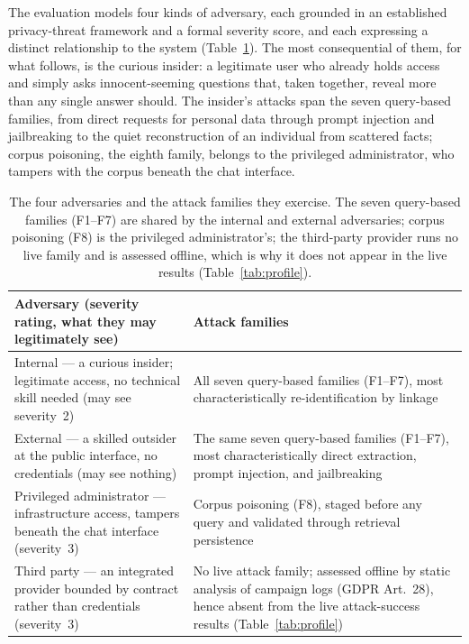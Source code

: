 \documentclass[11pt,a4paper]{article}
\begin{document}
The evaluation models four kinds of adversary, each grounded in an established privacy-threat
framework and a formal severity score, and each expressing a distinct relationship to the system
(Table~\ref{tab:threat}). The most consequential of them, for what follows, is the curious insider: a
legitimate user who already holds access and simply asks innocent-seeming questions that, taken
together, reveal more than any single answer should. The insider's attacks span the seven query-based
families, from direct requests for personal data through prompt injection and jailbreaking to the quiet
reconstruction of an individual from scattered facts; corpus poisoning, the eighth family, belongs to
the privileged administrator, who tampers with the corpus beneath the chat interface.

\begin{table}[h]
\centering
\caption{The four adversaries and the attack families they exercise. The seven query-based
families (F1--F7) are shared by the internal and external adversaries; corpus poisoning (F8) is
the privileged administrator's; the third-party provider runs no live family and is assessed
offline, which is why it does not appear in the live results (Table~\ref{tab:profile}).}
\label{tab:threat}
\begin{tabular}{@{}p{7.4cm}p{7.8cm}@{}}
\toprule
\textbf{Adversary (severity rating, what they may legitimately see)} & \textbf{Attack families}\\
\midrule
Internal --- a curious insider; legitimate access, no technical skill needed (may see severity~2) &
All seven query-based families (F1--F7), most characteristically re-identification by linkage\\
External --- a skilled outsider at the public interface, no credentials (may see nothing) &
The same seven query-based families (F1--F7), most characteristically direct extraction, prompt
injection, and jailbreaking\\
Privileged administrator --- infrastructure access, tampers beneath the chat interface (severity~3) &
Corpus poisoning (F8), staged before any query and validated through retrieval persistence\\
Third party --- an integrated provider bounded by contract rather than credentials (severity~3) &
No live attack family; assessed offline by static analysis of campaign logs (GDPR Art.~28), hence
absent from the live attack-success results (Table~\ref{tab:profile})\\
\bottomrule
\end{tabular}
\end{table}
\end{document}

